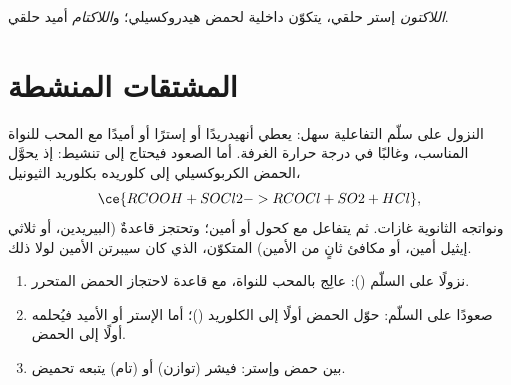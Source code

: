 \begin{definition}\label{def:b2:acyl-substitution:lactone}
\emph{اللاكتون} إستر حلقي، يتكوّن  داخلية لحمض
هيدروكسيلي؛ و\emph{اللاكتام} أميد حلقي.
\end{definition}

\section{المشتقات المنشطة}

النزول على سلّم التفاعلية سهل:  يعطي أنهيدريدًا أو إسترًا أو
أميدًا مع المحب للنواة المناسب، وغالبًا في درجة حرارة الغرفة. أما الصعود فيحتاج إلى تنشيط: إذ
يحوَّل الحمض الكربوكسيلي إلى كلوريده بكلوريد الثيونيل،
\[
  \ce{RCOOH + SOCl2 -> RCOCl + SO2 + HCl} ,
\]
ونواتجه الثانوية غازات. ثم يتفاعل  مع كحول أو أمين؛ وتحتجز قاعدةٌ
(البيريدين، أو ثلاثي إيثيل أمين، أو مكافئ ثانٍ من الأمين)  المتكوّن، الذي
كان سيبرتن الأمين لولا ذلك.

\begin{method}\label{met:b2:acyl-substitution:ladder}
\begin{enumerate}
  \item نزولًا على السلّم (): عالِج بالمحب
        للنواة، مع قاعدة لاحتجاز الحمض المتحرر.
  \item صعودًا على السلّم: حوّل الحمض أولًا إلى الكلوريد ()؛ أما الإستر أو الأميد فيُحلمه
        أولًا إلى الحمض.
  \item بين حمض وإستر:  فيشر (توازن) أو 
        (تام) يتبعه تحميض.
\end{enumerate}
\end{method}

